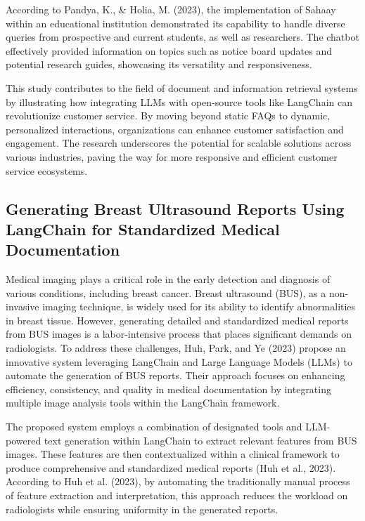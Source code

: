 According to Pandya, K., \& Holia, M. (2023), the implementation of Sahaay within an educational institution demonstrated its capability to handle diverse queries from prospective and current students, as well as researchers. The chatbot effectively provided information on topics such as notice board updates and potential research guides, showcasing its versatility and responsiveness.

This study contributes to the field of document and information retrieval systems by illustrating how integrating LLMs with open-source tools like LangChain can revolutionize customer service. By moving beyond static FAQs to dynamic, personalized interactions, organizations can enhance customer satisfaction and engagement. The research underscores the potential for scalable solutions across various industries, paving the way for more responsive and efficient customer service ecosystems.

\subsection{Generating Breast Ultrasound Reports Using LangChain for Standardized Medical Documentation}

Medical imaging plays a critical role in the early detection and diagnosis of various conditions, including breast cancer. Breast ultrasound (BUS), as a non-invasive imaging technique, is widely used for its ability to identify abnormalities in breast tissue. However, generating detailed and standardized medical reports from BUS images is a labor-intensive process that places significant demands on radiologists. To address these challenges, Huh, Park, and Ye (2023) propose an innovative system leveraging LangChain and Large Language Models (LLMs) to automate the generation of BUS reports. Their approach focuses on enhancing efficiency, consistency, and quality in medical documentation by integrating multiple image analysis tools within the LangChain framework.

The proposed system employs a combination of designated tools and LLM-powered text generation within LangChain to extract relevant features from BUS images. These features are then contextualized within a clinical framework to produce comprehensive and standardized medical reports (Huh et al., 2023). According to Huh et al. (2023), by automating the traditionally manual process of feature extraction and interpretation, this approach reduces the workload on radiologists while ensuring uniformity in the generated reports.

